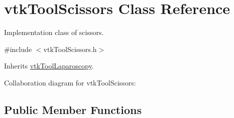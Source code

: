 \hypertarget{classvtkToolScissors}{
\section{vtkToolScissors Class Reference}
\label{classvtkToolScissors}
}


Implementation class of scissors.  




{\ttfamily \#include $<$vtkToolScissors.h$>$}



Inherits \hyperlink{classvtkToolLaparoscopy}{vtkToolLaparoscopy}.



Collaboration diagram for vtkToolScissors:\subsection*{Public Member Functions}
